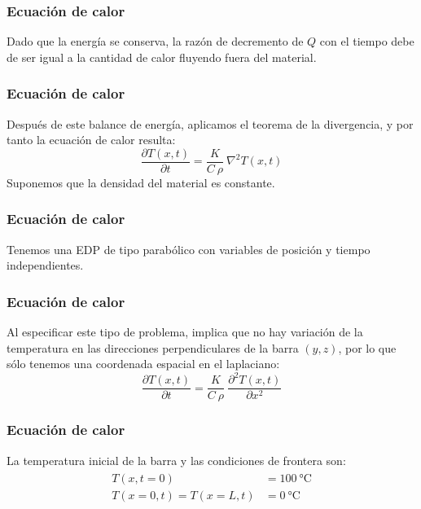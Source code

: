 \documentclass[12pt]{beamer}
\begin{document}
\begin{frame}
\frametitle{Ecuación de calor}
Dado que la energía se conserva, la razón de decremento de $Q$ con el tiempo debe de ser igual a la cantidad de calor fluyendo fuera del material. 
\end{frame}
\begin{frame}
\frametitle{Ecuación de calor}
Después de este balance de energía, aplicamos el teorema de la divergencia, y por tanto la ecuación de calor resulta:
\begin{equation}
\dfrac{\partial T(x,t)}{\partial t} = \dfrac{K}{C \: \rho} \: \nabla^{2} T(x,t)
\label{eq:ecuacion_17_57}
\end{equation}
Suponemos que la densidad del material es constante.
\end{frame}
\begin{frame}
\frametitle{Ecuación de calor}
Tenemos una EDP de tipo parabólico con variables de posición y tiempo independientes. 
\end{frame}
\begin{frame}
\frametitle{Ecuación de calor}
Al especificar este tipo de problema, implica que no hay variación de la temperatura en las direcciones perpendiculares de la barra $(y, z)$, por lo que sólo tenemos una coordenada espacial en el laplaciano:
\begin{equation}
\dfrac{\partial T(x,t)}{\partial t} = \dfrac{K}{C \: \rho} \: \dfrac{\partial^{2} T(x, t)}{\partial x^{2}}
\label{eq:ecuacion_17_58}
\end{equation}
\end{frame}
\begin{frame}
\frametitle{Ecuación de calor}
La temperatura inicial de la barra y las condiciones de frontera son:
\begin{align}
\begin{aligned}
T(x, t=0) &= \SI{100}{\degreeCelsius} \\
T(x=0, t) = T(x=L, t) &= \SI{0}{\degreeCelsius}
\end{aligned}
\label{eq:ecuacion_17_59}
\end{align}
\end{frame}
\end{document}
